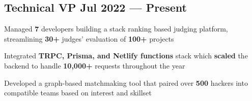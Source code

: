\subsection{{Technical VP \hfill Jul 2022 --- Present}}
\begin{zitemize}
    \item Managed \textbf{7} developers building a stack ranking based judging platform, streamlining \textbf{30+} judges' evaluation of \textbf{100+} projects
    \item Integrated \textbf{TRPC, Prisma, and Netlify functions} stack which \textbf{scaled} the backend to handle \textbf{10,000+} requests throughout the year
    \item Developed a graph-based matchmaking tool that paired over \textbf{500} hackers into compatible teams based on interest and skillset
\end{zitemize}

